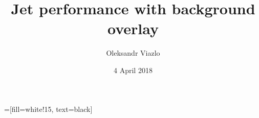 \documentclass[8pt]{beamer}
\newif\ifplacelogo %
\begin{document}
\newcommand{\myNode}{\tikz[baseline,inner sep=1pt] \node[anchor=base]}

 =[fill=white!15, text=black]



\title[ PandoraPFA FCC-ee \hspace{19.5em}\insertframenumber/
\inserttotalframenumber]{Jet performance with background overlay}


	\author[Oleksandr Viazlo]{Oleksandr Viazlo\\ 
	}
	
       
	\date{4 April 2018}


	
   	\frame{\titlepage}

   	

\placelogofalse
\end{document}
